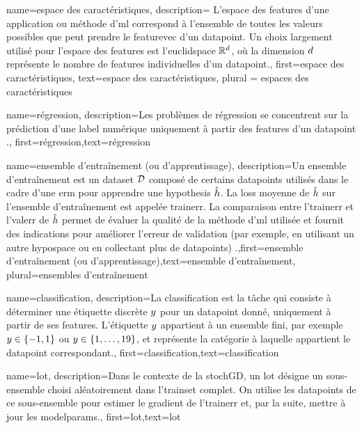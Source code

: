 {name={espace des caractéristiques},
	description={
		L’espace des \glspl{feature} d’une application ou méthode d'\gls{ml} 
		correspond à l’ensemble de toutes les valeurs possibles que peut prendre le \gls{featurevec} 
		d’un \gls{datapoint}. Un choix largement utilisé pour l’espace des \glspl{feature} est l’\gls{euclidspace} 
		$\mathbb{R}^{d}$, où la dimension $d$ représente le nombre de \glspl{feature} individuelles 
		d’un \gls{datapoint}.},
	first={espace des caractéristiques},
	text={espace des caractéristiques}, plural = {espaces des caractéristiques}
}

{name={régression},
	description={Les problèmes de régression se concentrent sur la prédiction d'une \gls{label} numérique uniquement à partir des \glspl{feature} d'un \gls{datapoint} \cite[Ch. 2]{MLBasics}.},
	first={régression},text={régression} 
}

{name={ensemble d'entraînement (ou d'apprentissage)},
	description={Un ensemble d'entraînement est un \gls{dataset} $\mathcal{D}$ composé de certains \glspl{datapoint} utilisés dans le cadre d'une \gls{erm} 
		pour apprendre une \gls{hypothesis} $\hat{h}$. La \gls{loss} moyenne de $\hat{h}$ sur 
		l'ensemble d'entraînement est appelée \gls{trainerr}. La comparaison entre l'\gls{trainerr} et l'\gls{valerr} de $\hat{h}$ permet de évaluer la qualité de la méthode d'\gls{ml} utilisée et fournit des indications 
		pour améliorer l'erreur de validation (par exemple, en utilisant un autre \gls{hypospace} ou en collectant plus de \glspl{datapoint}) \cite[Sec. 6.6]{MLBasics}.},first={ensemble d'entraînement (ou d'apprentissage)},text={ensemble d'entraînement}, plural={ensembles d'entraînement}  
}

{name={classification},
	description={La classification est la tâche qui consiste à déterminer une étiquette discrète $y$ pour un \gls{datapoint} donné, uniquement à partir de ses \glspl{feature}. L'étiquette $y$ appartient à un ensemble fini, par exemple $y \in \{-1,1\}$ ou $y \in \{1,\ldots,19\}$, et représente la catégorie à laquelle appartient le \gls{datapoint} correspondant.},
	first={classification},text={classification} 
}

{
	name={lot},
	description={Dans le contexte de la \gls{stochGD}, un lot désigne un sous-ensemble choisi aléatoirement dans l’\gls{trainset} complet. On utilise les \glspl{datapoint} de ce sous-ensemble pour estimer le \gls{gradient} de l’\gls{trainerr} et, par la suite, mettre à jour les \gls{modelparams}.}, 
	first={lot},text={lot}  
}

